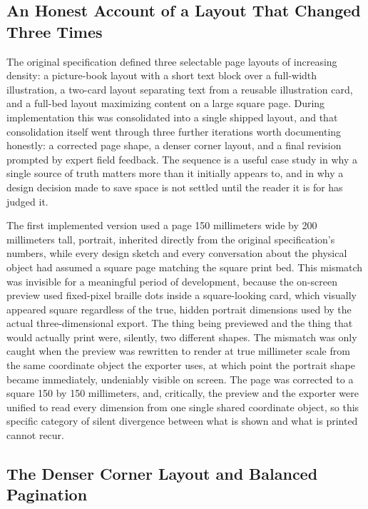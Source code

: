 \documentclass[conference]{IEEEtran}
\begin{document}
\subsection{An Honest Account of a Layout That Changed Three Times}

The original specification defined three selectable page layouts of increasing density: a picture-book layout with a short text block over a full-width illustration, a two-card layout separating text from a reusable illustration card, and a full-bed layout maximizing content on a large square page. During implementation this was consolidated into a single shipped layout, and that consolidation itself went through three further iterations worth documenting honestly: a corrected page shape, a denser corner layout, and a final revision prompted by expert field feedback. The sequence is a useful case study in why a single source of truth matters more than it initially appears to, and in why a design decision made to save space is not settled until the reader it is for has judged it.

The first implemented version used a page 150 millimeters wide by 200 millimeters tall, portrait, inherited directly from the original specification's numbers, while every design sketch and every conversation about the physical object had assumed a square page matching the square print bed. This mismatch was invisible for a meaningful period of development, because the on-screen preview used fixed-pixel braille dots inside a square-looking card, which visually appeared square regardless of the true, hidden portrait dimensions used by the actual three-dimensional export. The thing being previewed and the thing that would actually print were, silently, two different shapes. The mismatch was only caught when the preview was rewritten to render at true millimeter scale from the same coordinate object the exporter uses, at which point the portrait shape became immediately, undeniably visible on screen. The page was corrected to a square 150 by 150 millimeters, and, critically, the preview and the exporter were unified to read every dimension from one single shared coordinate object, so this specific category of silent divergence between what is shown and what is printed cannot recur.

\subsection{The Denser Corner Layout and Balanced Pagination}
\end{document}
